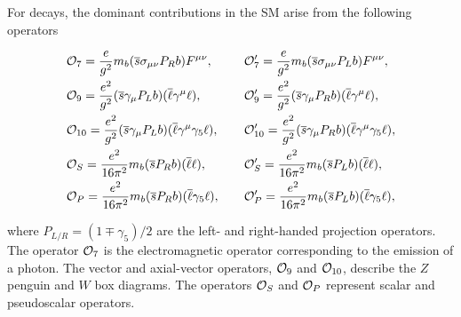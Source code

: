 For \btosll decays, the dominant contributions in the SM arise from the following operators~\cite{operators}

\begin{alignat}{2}
&{\mathcal{O}}_{7} = \frac{e}{g^{2}}m_{{b}}({\overline {{s}}}\sigma_{\mu\nu}P_{R}{b})F^{\mu\nu},~~~~~&&{\mathcal{O}}_{7}^{\prime} = \frac{e}{g^{2}}m_{{b}}({\overline {{s}}}\sigma_{\mu\nu}P_{L}{b})F^{\mu\nu}, \nonumber \\
&{\mathcal{O}}_{9} = \frac{e^{2}}{g^{2}}({\overline {{s}}}\gamma_{\mu}P_{L}{b})({\overline \ell}\gamma^{\mu}\ell), &&{\mathcal{O}}_{9}^{\prime} = \frac{e^{2}}{g^{2}}({\overline {{s}}}\gamma_{\mu}P_{R}{b})({\overline \ell}\gamma^{\mu}\ell), \nonumber \\
&{\mathcal{O}}_{10} = \frac{e^{2}}{g^{2}}({\overline {{s}}}\gamma_{\mu}P_{L}{b})({\overline \ell}\gamma^{\mu}\gamma_{5}\ell), &&{\mathcal{O}}_{10}^{\prime} = \frac{e^{2}}{g^{2}}({\overline {{s}}}\gamma_{\mu}P_{R}{b})({\overline \ell}\gamma^{\mu}\gamma_{5}\ell), \\
&{\mathcal{O}}_{S} = \frac{e^{2}}{16\pi^{2}}m_{{b}}({\overline {{s}}} P_{R}{b})({\overline \ell}\ell), &&{\mathcal{O}}_{S}^{\prime} = \frac{e^{2}}{16\pi^{2}}m_{{b}}({\overline {{s}}} P_{L}{b})({\overline \ell}\ell), \nonumber\\
&{\mathcal{O}}_{P} = \frac{e^{2}}{16\pi^{2}}m_{{b}}({\overline {{s}}} P_{R}{b})({\overline \ell}\gamma_{5}\ell), &&{\mathcal{O}}_{P}^{\prime} = \frac{e^{2}}{16\pi^{2}}m_{{b}}({\overline {{s}}} P_{L}{b})({\overline \ell}\gamma_{5}\ell), \nonumber
\end{alignat}

\noindent where $P_{L/R} = (1\mp\gamma_{5})/2$ are the left- and right-handed projection operators. The operator ${\mathcal{O}}_{7}$ is the electromagnetic operator corresponding to the emission of a photon. The vector and axial-vector operators, ${\mathcal{O}}_{9}$ and ${\mathcal{O}}_{10}$, describe the $Z$ penguin and $W$ box diagrams. The operators ${\mathcal{O}}_{S}$ and ${\mathcal{O}}_{P}$ represent scalar and pseudoscalar operators.

